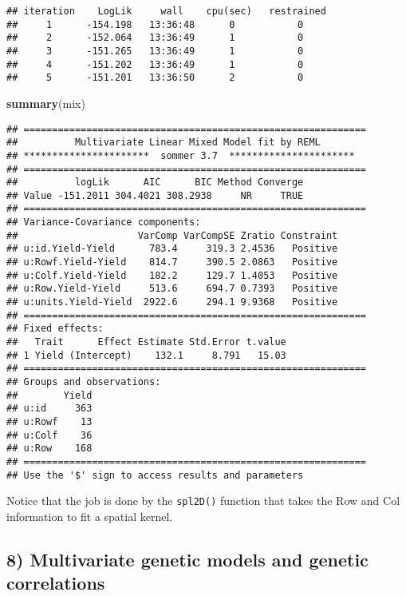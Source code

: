\documentclass[]{article}
\newenvironment{Shaded}{\begin{snugshade}}{\end{snugshade}}
\newcommand{\KeywordTok}[1]{\textcolor[rgb]{0.13,0.29,0.53}{\textbf{#1}}}
\newcommand{\NormalTok}[1]{#1}
\begin{document}
\begin{verbatim}
## iteration    LogLik     wall    cpu(sec)   restrained
##     1      -154.198   13:36:48      0           0
##     2      -152.064   13:36:49      1           0
##     3      -151.265   13:36:49      1           0
##     4      -151.202   13:36:49      1           0
##     5      -151.201   13:36:50      2           0
\end{verbatim}

\begin{Shaded}
\begin{Highlighting}[]
\KeywordTok{summary}\NormalTok{(mix)}
\end{Highlighting}
\end{Shaded}

\begin{verbatim}
## ============================================================
##          Multivariate Linear Mixed Model fit by REML         
## **********************  sommer 3.7  ********************** 
## ============================================================
##          logLik      AIC      BIC Method Converge
## Value -151.2011 304.4021 308.2938     NR     TRUE
## ============================================================
## Variance-Covariance components:
##                     VarComp VarCompSE Zratio Constraint
## u:id.Yield-Yield      783.4     319.3 2.4536   Positive
## u:Rowf.Yield-Yield    814.7     390.5 2.0863   Positive
## u:Colf.Yield-Yield    182.2     129.7 1.4053   Positive
## u:Row.Yield-Yield     513.6     694.7 0.7393   Positive
## u:units.Yield-Yield  2922.6     294.1 9.9368   Positive
## ============================================================
## Fixed effects:
##   Trait      Effect Estimate Std.Error t.value
## 1 Yield (Intercept)    132.1     8.791   15.03
## ============================================================
## Groups and observations:
##        Yield
## u:id     363
## u:Rowf    13
## u:Colf    36
## u:Row    168
## ============================================================
## Use the '$' sign to access results and parameters
\end{verbatim}

Notice that the job is done by the \texttt{spl2D()} function that takes
the Row and Col information to fit a spatial kernel.

\subsection{8) Multivariate genetic models and genetic
correlations}\label{multivariate-genetic-models-and-genetic-correlations}
\end{document}
